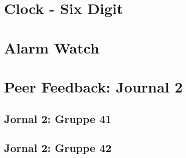 \documentclass[12pt,a4paper]{article}
\begin{document}
\section{Clock - Six Digit}


\section{Alarm Watch}


\section{Peer Feedback: Journal 2}

\subsection{Jornal 2: Gruppe 41}

\subsection{Jornal 2: Gruppe 42}
\end{document}
